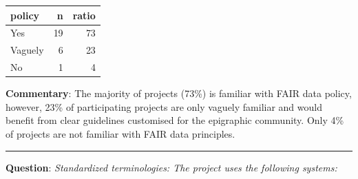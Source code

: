 \documentclass[
  12pt,
]{scrreprt}
\begin{document}
\footnotesize

\begin{longtable}[]{@{}lrr@{}}
\toprule
policy & n & ratio \\
\midrule
\endhead
Yes & 19 & 73 \\
Vaguely & 6 & 23 \\
No & 1 & 4 \\
\bottomrule
\end{longtable}

\normalsize

\textbf{Commentary}: The majority of projects (73\%) is familiar with
FAIR data policy, however, 23\% of participating projects are only
vaguely familiar and would benefit from clear guidelines customised for
the epigraphic community. Only 4\% of projects are not familiar with
FAIR data principles.

\begin{center}\rule{0.5\linewidth}{0.5pt}\end{center}

\textbf{Question}: \emph{Standardized terminologies: The project uses
the following systems:}

\footnotesize
\end{document}
